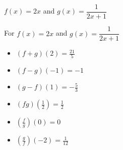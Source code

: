 {$f(x) = 2x$ and  $g(x) = \dfrac{1}{2x+1}$}
{For  $f(x) = 2x$ and  $g(x) = \dfrac{1}{2x+1}$

\begin{multicols}{2}
\begin{itemize}
\item  $(f+g)(2) = \frac{21}{5}$
\item  $(f-g)(-1) = -1$
\item  $(g-f)(1) = -\frac{5}{3}$
\item  $(fg)\left(\frac{1}{2}\right) = \frac{1}{2}$
\item  $\left(\frac{f}{g}\right)(0) = 0$
\item  $\left(\frac{g}{f}\right)\left(-2\right) = \frac{1}{12}$
\end{itemize}
\end{multicols}
}